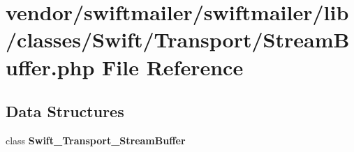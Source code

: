 \section{vendor/swiftmailer/swiftmailer/lib/classes/\+Swift/\+Transport/\+Stream\+Buffer.php File Reference}
\label{_stream_buffer_8php}
\subsection*{Data Structures}
\begin{DoxyCompactItemize}
\item 
class {\bf Swift\+\_\+\+Transport\+\_\+\+Stream\+Buffer}
\end{DoxyCompactItemize}

